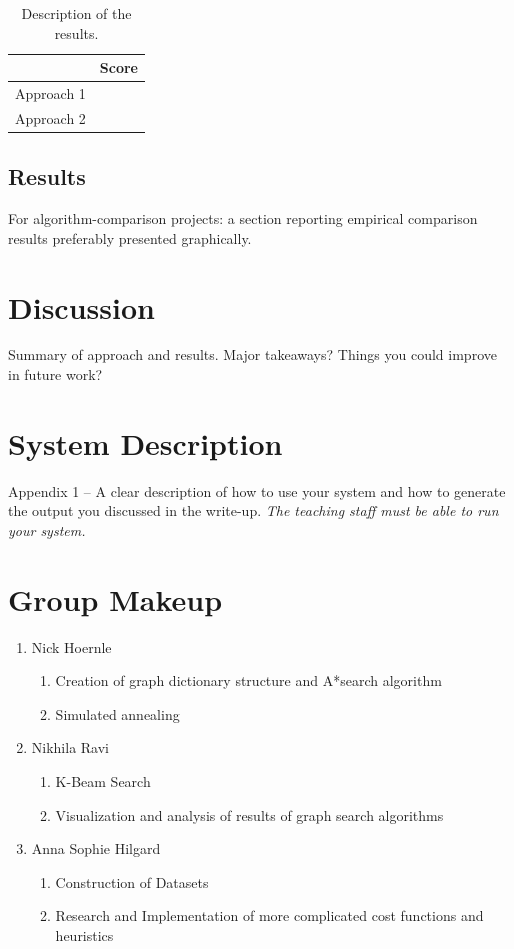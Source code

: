 \documentclass[11pt]{article}
\begin{document}
\begin{table}[H]
  \centering
  \begin{tabular}{ll}
    \toprule
    & Score \\
    \midrule
    Approach 1 & \\
    Approach 2 & \\
    \bottomrule
  \end{tabular}
  \caption{Description of the results.}
\end{table}


\subsection{Results}

 For algorithm-comparison projects: a section reporting empirical comparison results preferably presented graphically.


\section{Discussion}

Summary of approach and results. Major takeaways? Things you could improve in future work?

\appendix

\section{System Description}

 Appendix 1 – A clear description of how to use your system and how to generate the output you discussed in the write-up. \emph{The teaching staff must be able to run your system.}

\section{Group Makeup}

\begin{enumerate}
\item Nick Hoernle
\begin{enumerate}
\item Creation of graph dictionary structure and A*search algorithm
\item Simulated annealing
\end{enumerate}
\item Nikhila Ravi
\begin{enumerate}
\item K-Beam Search
\item Visualization and analysis of results of graph search algorithms
\end{enumerate}
\item Anna Sophie Hilgard
\begin{enumerate}
\item Construction of Datasets
\item Research and Implementation of more complicated cost functions and heuristics
\end{enumerate}
\end{enumerate}


 

\end{document}
